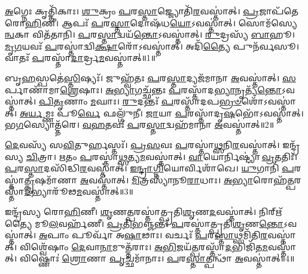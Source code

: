 \clearpage
{}
\setcounter{anuvakam}{0}

\-\ul{𑌅}\-𑌗𑍍𑌨𑍇𑌃 𑌕𑍃𑌤𑍍𑌤𑌿᳴𑌕𑌾𑌃।
\-\ul{𑌶𑍁}\-𑌕𑍍𑌰𑌂 \ul{𑌪}\-𑌰\-\ul{𑌸𑍍𑌤𑌾}\-𑌜𑍍𑌜𑍍𑌯𑍋𑌤𑌿᳴\-\ul{𑌰}\-𑌵𑌸𑍍𑌤𑌾॑𑌤𑍍।
\-\ul{𑌪𑍍𑌰}\-𑌜𑌾𑌪᳴𑌤𑍇 𑌰𑍋\-\ul{𑌹𑌿}\-𑌣𑍀।
𑌆𑌪𑌃᳴ \ul{𑌪}\-𑌰\-\ul{𑌸𑍍𑌤𑌾}\-𑌦𑍋𑌷᳴𑌧\-\ul{𑌯𑍋}\-\-𑌽𑌵𑌸𑍍𑌤𑌾॑𑌤𑍍।
𑌸𑍋𑌮᳴𑌸𑍍𑌯𑍇\-\ul{𑌨𑍍𑌵}\-𑌕𑌾 𑌵𑌿𑌤᳴𑌤𑌾𑌨𑌿।
\-\ul{𑌪}\-𑌰\-\ul{𑌸𑍍𑌤𑌾}\-𑌦𑍍𑌵𑌯᳴\-\ul{𑌨𑍍𑌤𑍋}\-\-𑌽𑌵𑌸𑍍𑌤𑌾॑𑌤𑍍।
\-\ul{𑌰𑍁}\-𑌦𑍍𑌰𑌸𑍍𑌯᳴ \ul{𑌬𑌾}\-𑌹𑍂।
\-\ul{𑌮𑍃}\-\-\ul{𑌗}\-𑌯𑌵𑌃᳴ \ul{𑌪}\-𑌰𑌸𑍍𑌤𑌾॑𑌦𑍍𑌵𑌿\-\ul{𑌕𑍍𑌷𑌾}\-𑌰𑍋᳴\-𑌽𑌵𑌸𑍍𑌤𑌾॑𑌤𑍍।
𑌅𑌦𑌿᳴\-\ul{𑌤𑍍𑌯𑍈} 𑌪𑍁𑌨᳴𑌰𑍍𑌵𑌸𑍂।
𑌵𑌾𑌤𑌃᳴ \ul{𑌪}\-𑌰𑌸𑍍𑌤𑌾᳴\-\ul{𑌦𑌾}\-𑌰𑍍𑌦𑍍𑌰\-\ul{𑌮}\-𑌵𑌸𑍍𑌤𑌾॑𑌤𑍍॥1॥

𑌬𑍃\-\ul{𑌹}\-𑌸𑍍𑌪𑌤𑍇॑\-\ul{𑌸𑍍𑌤𑌿}\-𑌷𑍍𑌯𑌃᳴।
𑌜𑍁𑌹𑍍𑌵᳴𑌤𑌃 \ul{𑌪}\-𑌰\-\ul{𑌸𑍍𑌤𑌾}\-𑌦𑍍𑌯𑌜᳴𑌮𑌾𑌨𑌾 \ul{𑌅}\-𑌵𑌸𑍍𑌤𑌾॑𑌤𑍍।
\-\ul{𑌸}\-𑌰𑍍𑌪𑌾𑌣𑌾᳴𑌮𑌾\-\ul{𑌶𑍍𑌰𑍇}\-𑌷𑌾𑌃।
\-\ul{𑌅}\-\-\ul{𑌭𑍍𑌯𑌾}\-𑌗𑌚𑍍𑌛᳴𑌨𑍍𑌤𑌃 \ul{𑌪}\-𑌰𑌸𑍍𑌤𑌾᳴𑌦\-\ul{𑌭𑍍𑌯𑌾}\-𑌨𑍃𑌤𑍍𑌯᳴\-\ul{𑌨𑍍𑌤𑍋}\-\-𑌽𑌵𑌸𑍍𑌤𑌾॑𑌤𑍍।
\-\ul{𑌪𑌿}\-\-\ul{𑌤𑍃}\-𑌣𑌾𑌂 \ul{𑌮}\-𑌘𑌾𑌃।
\-\ul{𑌰𑍁}\-𑌦𑌨𑍍𑌤𑌃᳴ \ul{𑌪}\-𑌰𑌸𑍍𑌤𑌾᳴𑌦𑌪\-\ul{𑌭𑍍𑌰}\-\-\ul{𑍞}\-𑌶𑍋᳴\-𑌽𑌵𑌸𑍍𑌤𑌾॑𑌤𑍍।
\-\ul{𑌅}\-\-\ul{𑌰𑍍𑌯}\-𑌮𑍍𑌣𑌃 𑌪𑍂\-\ul{𑌰𑍍𑌵𑍇} 𑌫𑌲𑍍𑌗𑍁᳴𑌨𑍀।
\-\ul{𑌜𑌾}\-𑌯𑌾 \ul{𑌪}\-𑌰𑌸𑍍𑌤𑌾᳴𑌦𑍃\-\ul{𑌷}\-𑌭𑍋᳴\-𑌽𑌵𑌸𑍍𑌤𑌾॑𑌤𑍍।
𑌭\-\ul{𑌗}\-𑌸𑍍𑌯𑍋𑌤𑍍𑌤᳴𑌰𑍇।
\-\ul{𑌵}\-\-\ul{𑌹}\-𑌤𑌵𑌃᳴ \ul{𑌪}\-𑌰\-\ul{𑌸𑍍𑌤𑌾}\-𑌦𑍍𑌵𑌹᳴𑌮𑌾𑌨𑌾 \ul{𑌅}\-𑌵𑌸𑍍𑌤𑌾॑𑌤𑍍॥2॥

\-\ul{𑌦𑍇}\-𑌵𑌸𑍍𑌯᳴ 𑌸\-\ul{𑌵𑌿}\-𑌤𑍁𑌰𑍍\mbox{}𑌹𑌸𑍍𑌤𑌃᳴।
\-\ul{𑌪𑍍𑌰}\-\-\ul{𑌸}\-𑌵𑌃 \ul{𑌪}\-𑌰𑌸𑍍𑌤𑌾॑\-\ul{𑌥𑍍𑌸}\-𑌨𑌿\-\ul{𑌰}\-𑌵𑌸𑍍𑌤𑌾॑𑌤𑍍।
𑌇𑌨𑍍𑌦𑍍𑌰᳴𑌸𑍍𑌯 \ul{𑌚𑌿}\-𑌤𑍍𑌰𑌾।
\-\ul{𑌋}\-𑌤𑌂 \ul{𑌪}\-𑌰𑌸𑍍𑌤𑌾॑\-\ul{𑌥𑍍𑌸}\-𑌤𑍍𑌯\-\ul{𑌮}\-𑌵𑌸𑍍𑌤𑌾॑𑌤𑍍।
\-\ul{𑌵𑌾}\-𑌯𑍋𑌰𑍍𑌨𑌿𑌷𑍍𑌟𑍍𑌯𑌾॑ \ul{𑌵𑍍𑌰}\-𑌤𑌤𑌿𑌃᳴।
\-\ul{𑌪}\-𑌰\-\ul{𑌸𑍍𑌤𑌾}\-𑌦𑌸𑌿᳴𑌦𑍍𑌧𑌿\-\ul{𑌰}\-𑌵𑌸𑍍𑌤𑌾॑𑌤𑍍।
\-\ul{𑌇}\-\-\ul{𑌨𑍍𑌦𑍍𑌰𑌾}\-\-\ul{𑌗𑍍𑌨𑌿}\-𑌯𑍋𑌰𑍍𑌵𑌿𑌶𑌾᳴𑌖𑍇।
\-\ul{𑌯𑍁}\-𑌗𑌾𑌨𑌿᳴ \ul{𑌪}\-𑌰𑌸𑍍𑌤𑌾॑\-\ul{𑌤𑍍𑌕𑍃}\-𑌷𑌮𑌾᳴𑌣𑌾 \ul{𑌅}\-𑌵𑌸𑍍𑌤𑌾॑𑌤𑍍।
\-\ul{𑌮𑌿}\-𑌤𑍍𑌰𑌸𑍍𑌯𑌾᳴𑌨𑍂\-\ul{𑌰𑌾}\-𑌧𑌾𑌃।
\-\ul{𑌅}\-\-\ul{𑌭𑍍𑌯𑌾}\-𑌰𑍋𑌹᳴\-\ul{𑌤𑍍𑌪}\-𑌰𑌸𑍍𑌤𑌾᳴\-\-\ul{𑌦}\-𑌭𑍍𑌯𑌾𑌰𑍂᳴𑌢\-\ul{𑌮}\-𑌵𑌸𑍍𑌤𑌾॑𑌤𑍍॥3॥

𑌇𑌨𑍍𑌦𑍍𑌰᳴𑌸𑍍𑌯 𑌰𑍋\-\ul{𑌹𑌿}\-𑌣𑍀।
\-\ul{𑌶𑍃}\-𑌣\-\ul{𑌤𑍍𑌪}\-𑌰𑌸𑍍𑌤𑌾॑𑌤𑍍𑌪𑍍𑌰𑌤𑌿\-\ul{𑌶𑍃}\-𑌣\-\ul{𑌦}\-𑌵𑌸𑍍𑌤𑌾॑𑌤𑍍।
𑌨𑌿𑌰𑍍\mbox{}𑌋᳴𑌤𑍍𑌯𑍈 𑌮𑍂\-\ul{𑌲}\-𑌵𑌰𑍍\mbox{}𑌹᳴𑌣𑍀।
\-\ul{𑌪𑍍𑌰}\-\-\ul{𑌤𑌿}\-\-\ul{𑌭}\-𑌞𑍍𑌜𑌨𑍍𑌤𑌃᳴ \ul{𑌪}\-𑌰𑌸𑍍𑌤𑌾॑𑌤𑍍𑌪𑍍𑌰𑌤𑌿\-\ul{𑌶𑍃}\-𑌣\-\ul{𑌨𑍍𑌤𑍋}\-\-𑌽𑌵𑌸𑍍𑌤𑌾॑𑌤𑍍।
\-\ul{𑌅}\-𑌪𑌾𑌂 𑌪𑍂𑌰𑍍𑌵𑌾᳴ 𑌅\-\ul{𑌷𑌾}\-𑌢𑌾𑌃।
𑌵𑌰𑍍𑌚𑌃᳴ \ul{𑌪}\-𑌰\-\ul{𑌸𑍍𑌤𑌾}\-𑌥𑍍𑌸𑌮𑌿᳴𑌤𑌿\-\ul{𑌰}\-𑌵𑌸𑍍𑌤𑌾॑𑌤𑍍।
𑌵𑌿𑌶𑍍𑌵𑍇᳴𑌷𑌾𑌂 \ul{𑌦𑍇}\-𑌵𑌾\-\ul{𑌨𑌾}\-𑌮𑍁𑌤𑍍𑌤᳴𑌰𑌾𑌃।
\-\ul{𑌅}\-\-\ul{𑌭𑌿}\-𑌜𑌯᳴\-\ul{𑌤𑍍𑌪}\-𑌰𑌸𑍍𑌤𑌾᳴\-\ul{𑌦}\-𑌭𑌿𑌜𑌿᳴𑌤\-\ul{𑌮}\-𑌵𑌸𑍍𑌤𑌾॑𑌤𑍍।
𑌵𑌿𑌷𑍍𑌣𑍋𑌃॑ \ul{𑌶𑍍𑌰𑍋}\-𑌣𑌾 \ul{𑌪𑍃}\-𑌚𑍍𑌛𑌮𑌾᳴𑌨𑌾𑌃।
\-\ul{𑌪}\-𑌰\-\ul{𑌸𑍍𑌤𑌾}\-𑌤𑍍𑌪𑌨𑍍𑌥𑌾᳴ \ul{𑌅}\-𑌵𑌸𑍍𑌤𑌾॑𑌤𑍍॥4॥

